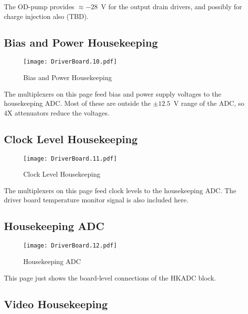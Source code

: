 \documentclass[a4paper,12pt]{article}
\begin{document}
The OD-pump provides $\approx -28$\ V for the output drain drivers, and possibly for charge injection also (TBD).

\subsection{Bias and Power Housekeeping}
   \begin{figure}
   \begin{center}
   \texttt{[image: DriverBoard.10.pdf]}
   \end{center}
   \caption{Bias and Power Housekeeping}
   \end{figure}

The multiplexers on this page feed bias and power supply voltages to the housekeeping ADC. Most of these are outside the $\pm 12.5$\ V range of the ADC, so 4X attenuators reduce the voltages.

\subsection{Clock Level Housekeeping}
   \begin{figure}
   \begin{center}
   \texttt{[image: DriverBoard.11.pdf]}
   \end{center}
   \caption{Clock Level Housekeeping}
   \end{figure}

The multiplexers on this page feed clock levels to the housekeeping ADC. The driver board temperature monitor signal is also included here.

\subsection{Housekeeping ADC}

   \begin{figure}
   \begin{center}
   \texttt{[image: DriverBoard.12.pdf]}
   \end{center}
   \caption{Housekeeping ADC}
   \end{figure}

This page just shows the board-level connections of the HKADC block.

\subsection{Video Housekeeping}
\end{document}
